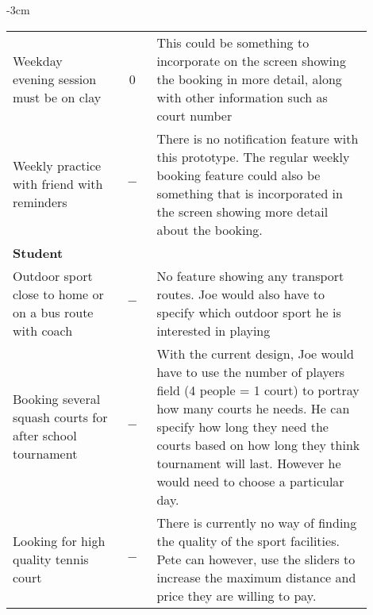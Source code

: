 \begin{center}
\begin{adjustwidth*}{}{-3cm}
\begin{longtable}{@{\extracolsep{\fill}}p{0.3\linewidth} c p{0.6\linewidth}}
		Weekday evening session must be on clay & 0 & This could be something
		to incorporate on the screen showing the booking in more detail, along
		with other information such as court number \\

		Weekly practice with friend with reminders & $-$ & There is no
		notification feature with this prototype. The regular weekly booking
		feature could also be something that is incorporated in the screen
		showing more detail about the booking. \\

		\midrule
		\multicolumn{3}{l}{\textbf{Student}}\\
		\cmidrule(r){1-3}
		Outdoor sport close to home or on a bus route with coach & $-$ & No
		feature showing any transport routes. Joe would also have to specify
		which outdoor sport he is interested in playing \\

		Booking several squash courts for after school tournament & $-$ &
		With the current design, Joe would have to use the number of players
		field (4 people = 1 court) to portray how many courts he needs. He can
		specify how long they need the courts based on how long they think
		tournament will last. However he would need to choose a particular day.
		\\

		Looking for high quality tennis court & $-$ & There is currently no
		way of finding the quality of the sport facilities. Pete can however,
		use the sliders to increase the maximum distance and price they are
		willing to pay. \\
		\bottomrule
	\end{longtable}
	\end{adjustwidth*}
\end{center}
